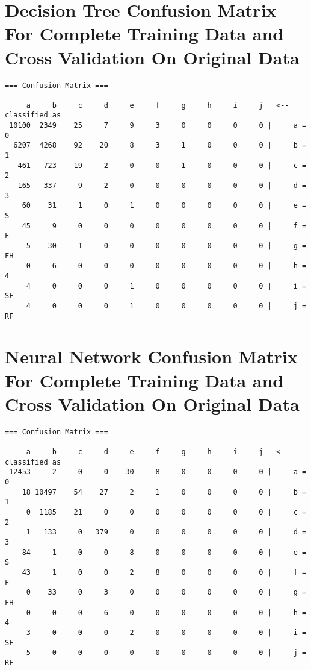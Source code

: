 \documentclass[11pt, a4paper]{article}
\begin{document}
\section{Decision Tree Confusion Matrix For Complete Training Data and Cross Validation On Original Data}

\begin{verbatim}
=== Confusion Matrix ===

     a     b     c     d     e     f     g     h     i     j   <-- classified as
 10100  2349    25     7     9     3     0     0     0     0 |     a = 0
  6207  4268    92    20     8     3     1     0     0     0 |     b = 1
   461   723    19     2     0     0     1     0     0     0 |     c = 2
   165   337     9     2     0     0     0     0     0     0 |     d = 3
    60    31     1     0     1     0     0     0     0     0 |     e = S
    45     9     0     0     0     0     0     0     0     0 |     f = F
     5    30     1     0     0     0     0     0     0     0 |     g = FH
     0     6     0     0     0     0     0     0     0     0 |     h = 4
     4     0     0     0     1     0     0     0     0     0 |     i = SF
     4     0     0     0     1     0     0     0     0     0 |     j = RF
\end{verbatim}

\section{Neural Network Confusion Matrix For Complete Training Data and Cross Validation On  Original Data}

\begin{verbatim}
=== Confusion Matrix ===

     a     b     c     d     e     f     g     h     i     j   <-- classified as
 12453     2     0     0    30     8     0     0     0     0 |     a = 0
    18 10497    54    27     2     1     0     0     0     0 |     b = 1
     0  1185    21     0     0     0     0     0     0     0 |     c = 2
     1   133     0   379     0     0     0     0     0     0 |     d = 3
    84     1     0     0     8     0     0     0     0     0 |     e = S
    43     1     0     0     2     8     0     0     0     0 |     f = F
     0    33     0     3     0     0     0     0     0     0 |     g = FH
     0     0     0     6     0     0     0     0     0     0 |     h = 4
     3     0     0     0     2     0     0     0     0     0 |     i = SF
     5     0     0     0     0     0     0     0     0     0 |     j = RF
\end{verbatim}
\end{document}
